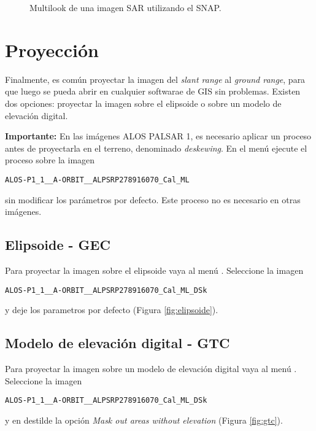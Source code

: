 \begin{figure}[h!]
    \centering
    \hspace{1cm}
    \caption{Multilook de una imagen SAR utilizando el SNAP.}
    \label{fig:multilook}
\end{figure}


\section{Proyección}\label{sec:proyeccion}

Finalmente, es común proyectar la imagen del \emph{slant range} al \emph{ground range}, para que luego se pueda abrir en cualquier softwarae de GIS sin problemas. Existen dos opciones: proyectar la imagen sobre el elipsoide o sobre un modelo de elevación digital.

{\bf Importante:} En las imágenes ALOS PALSAR 1, es necesario aplicar un proceso antes de proyectarla en el terreno, denominado \emph{deskewing}. En el menú  ejecute el proceso sobre la imagen
\begin{center} \texttt{ALOS-P1\_1\_\_A-ORBIT\_\_ALPSRP278916070\_Cal\_ML} \end{center} sin modificar los parámetros por defecto. Este proceso no es necesario en otras imágenes.

\subsection{Elipsoide - GEC}

Para proyectar la imagen sobre el elipsoide vaya al menú . Seleccione la imagen
\begin{center} \texttt{ALOS-P1\_1\_\_A-ORBIT\_\_ALPSRP278916070\_Cal\_ML\_DSk} \end{center} y deje los parametros por defecto (Figura \ref{fig:elipsoide}).

\subsection{Modelo de elevación digital - GTC}

Para proyectar la imagen sobre un modelo de elevación digital vaya al menú . Seleccione la imagen
\begin{center} \texttt{ALOS-P1\_1\_\_A-ORBIT\_\_ALPSRP278916070\_Cal\_ML\_DSk}
  \end{center}
  y en  destilde la opción \emph{Mask out areas without elevation} (Figura \ref{fig:gtc}).

